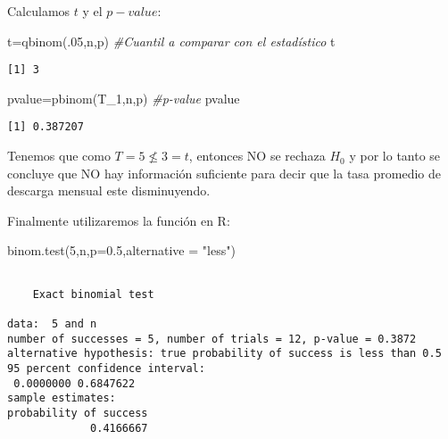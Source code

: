 \documentclass[
  a4paper,
  oneside,
  openany]{book}
\newenvironment{Shaded}{\begin{snugshade}}{\end{snugshade}}
\newcommand{\AttributeTok}[1]{\textcolor[rgb]{0.77,0.63,0.00}{#1}}
\newcommand{\CommentTok}[1]{\textcolor[rgb]{0.56,0.35,0.01}{\textit{#1}}}
\newcommand{\DecValTok}[1]{\textcolor[rgb]{0.00,0.00,0.81}{#1}}
\newcommand{\FloatTok}[1]{\textcolor[rgb]{0.00,0.00,0.81}{#1}}
\newcommand{\FunctionTok}[1]{\textcolor[rgb]{0.00,0.00,0.00}{#1}}
\newcommand{\NormalTok}[1]{#1}
\newcommand{\OtherTok}[1]{\textcolor[rgb]{0.56,0.35,0.01}{#1}}
\newcommand{\StringTok}[1]{\textcolor[rgb]{0.31,0.60,0.02}{#1}}
\begin{document}
Calculamos \(t\) y el \(p-value\):

\begin{Shaded}
\begin{Highlighting}[]
\NormalTok{t}\OtherTok{=}\FunctionTok{qbinom}\NormalTok{(.}\DecValTok{05}\NormalTok{,n,p)       }\CommentTok{\#Cuantil a comparar con el estadístico}
\NormalTok{t}
\end{Highlighting}
\end{Shaded}

\begin{verbatim}
[1] 3
\end{verbatim}

\begin{Shaded}
\begin{Highlighting}[]
\NormalTok{pvalue}\OtherTok{=}\FunctionTok{pbinom}\NormalTok{(T\_1,n,p)  }\CommentTok{\#p{-}value}
\NormalTok{pvalue}
\end{Highlighting}
\end{Shaded}

\begin{verbatim}
[1] 0.387207
\end{verbatim}

Tenemos que como \(T=5\nleq 3 =t\), entonces NO se rechaza \(H_0\) y por lo tanto se concluye que NO hay información suficiente para decir que la tasa promedio de descarga mensual este disminuyendo.

Finalmente utilizaremos la función en R:

\begin{Shaded}
\begin{Highlighting}[]
\FunctionTok{binom.test}\NormalTok{(}\DecValTok{5}\NormalTok{,n,}\AttributeTok{p=}\FloatTok{0.5}\NormalTok{,}\AttributeTok{alternative =} \StringTok{"less"}\NormalTok{)}
\end{Highlighting}
\end{Shaded}

\begin{verbatim}

    Exact binomial test

data:  5 and n
number of successes = 5, number of trials = 12, p-value = 0.3872
alternative hypothesis: true probability of success is less than 0.5
95 percent confidence interval:
 0.0000000 0.6847622
sample estimates:
probability of success 
             0.4166667 
\end{verbatim}
\end{document}
